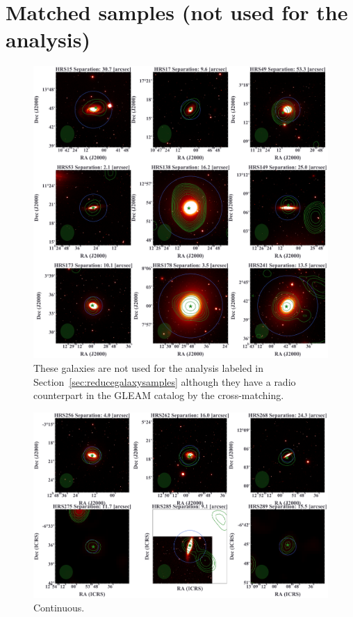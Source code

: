 \documentclass[12pt,a4paper,twoside,openright,final,titlepage]{report}
\begin{document}
\section{Matched samples (not used for the analysis)}
\begin{figure}[htbp]
    \centering
    \includegraphics[width=\linewidth]{Figures/AppendixB_galaxyimages_notselected.pdf}
    \caption[Galaxy images (9/15 not used for the analysis)]{\label{fig:galaxyimages_notselected}
        These galaxies are not used for the analysis labeled in Section~\ref{sec:reducegalaxysamples} although they have a radio counterpart in the GLEAM catalog by the cross-matching.
    }
\end{figure}

\begin{figure}[htbp]
    \centering
    \includegraphics[width=\linewidth]{Figures/AppendixB_galaxyimages_notselected2.pdf}
    \caption[Galaxy images (6/15 not used for the analysis)]{\label{fig:galaxyimages_notselected}
        Continuous.
    }
\end{figure}
\end{document}
